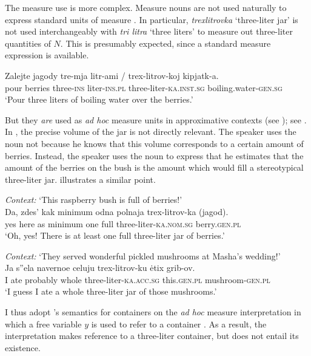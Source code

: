 \documentclass[output=paper,
colorlinks,
citecolor=brown,
newtxmath
]{langscibook}
\begin{document}
\noindent The measure use is more complex. Measure nouns are not used naturally to express standard units of measure . In particular, \textit{trexlitrovka} `three-liter jar' is not used interchangeably with \textit{tri litra} `three liters' to measure out three-liter quantities of $N$. This is presumably expected, since a standard measure expression is available.

\ea\label{ex:31} \gll Zalejte jagody tre-mja litr-ami /  trex-litrov-koj kipjatk-a.\\
pour berries three-\textsc{ins} liter-\textsc{ins.pl} {} {} three-liter-\textsc{ka.inst.sg} boiling.water-\textsc{gen.sg}\\
\glt `Pour three liters of boiling water over the berries.'
\z

\noindent But they \textit{are} used as \textit{ad hoc} measure units in approximative contexts (see \citealt{Partee.Borschev2012, Rothstein2017}); see . In , the precise volume of the jar is not directly relevant. The speaker uses the noun not because he knows that this volume corresponds to a certain amount of berries. Instead, the speaker uses the noun to express that he estimates that the amount of the berries on the bush is the amount which would fill a stereotypical three-liter jar.  illustrates a similar point.

    \largerpage[-2] %

\ea\label{ex:32} \textit{Context:} `This raspberry bush is full of berries!'\\
\gll Da, zdes' kak minimum odna polnaja trex-litrov-ka (jagod).\\
yes here as minimum one full three-liter-\textsc{ka.nom.sg} \phantom{(}berry.\textsc{gen.pl}\\
\glt `Oh, yes! There is at least one full three-liter jar of berries.'
\z

\ea\label{ex:33} \textit{Context:} `They served wonderful pickled mushrooms at Masha's wedding!'\\
\gll Ja s''ela navernoe celuju trex-litrov-ku ėtix grib-ov.\\
I ate probably whole three-liter-\textsc{ka.acc.sg} this.\textsc{gen.pl} mushroom-\textsc{gen.pl}\\
\glt `I guess I ate a whole three-liter jar of those mushrooms.'
\z

\noindent I thus adopt \citeauthor{Partee.Borschev2012}'s semantics for containers on the \textit{ad hoc} measure interpretation in which a free variable $y$ is used to refer to a container . As a result, the interpretation makes reference to a three-liter container, but does not entail its existence.
\end{document}
